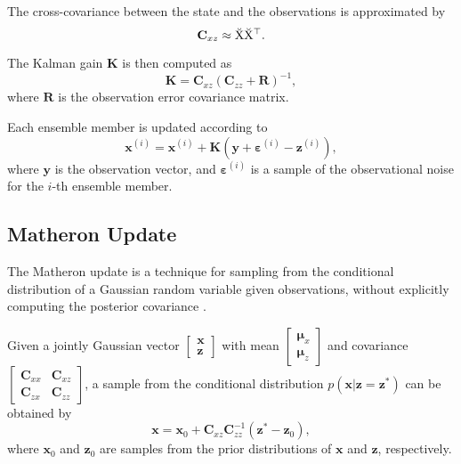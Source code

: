 \documentclass{article}
\theoremstyle{plain}
\begin{document}
The cross-covariance between the state and the observations is approximated by
\begin{equation}
    \mathbf{C}_{xz} \approx \breve{\mathrm{X}} \breve{\mathrm{X}}^\top.
\end{equation}

The Kalman gain $\mathbf{K}$ is then computed as
\begin{equation}
    \mathbf{K} = \mathbf{C}_{xz} \left( \mathbf{C}_{zz} + \mathbf{R} \right)^{-1},
    \label{eq:kalman_gain}
\end{equation}
where $\mathbf{R}$ is the observation error covariance matrix.

Each ensemble member is updated according to
\begin{equation}
    \mathbf{x}^{(i)} = \mathbf{x}^{(i)} + \mathbf{K} \left( \mathbf{y} + \boldsymbol{\varepsilon}^{(i)} - \mathbf{z}^{(i)} \right),
    \label{eq:enkf_update}
\end{equation}
where $\mathbf{y}$ is the observation vector, and $\boldsymbol{\varepsilon}^{(i)}$ is a sample of the observational noise for the $i$-th ensemble member.

\subsection{Matheron Update}

The Matheron update is a technique for sampling from the conditional distribution of a Gaussian random variable given observations, without explicitly computing the posterior covariance \citep{Doucet2010Note,Wilson2020Efficiently,Wilson2021Pathwise}.

Given a jointly Gaussian vector $\begin{bmatrix} \mathbf{x} \\ \mathbf{z} \end{bmatrix}$ with mean $\begin{bmatrix} \boldsymbol{\mu}_x \\ \boldsymbol{\mu}_z \end{bmatrix}$ and covariance $\begin{bmatrix} \mathbf{C}_{xx} & \mathbf{C}_{xz} \\ \mathbf{C}_{zx} & \mathbf{C}_{zz} \end{bmatrix}$, a sample from the conditional distribution $p(\mathbf{x} | \mathbf{z} = \mathbf{z}^*)$ can be obtained by
\begin{equation}
    \mathbf{x} = \mathbf{x}_0 + \mathbf{C}_{xz} \mathbf{C}_{zz}^{-1} \left( \mathbf{z}^* - \mathbf{z}_0 \right),
    \label{eq:matheron_update}
\end{equation}
where $\mathbf{x}_0$ and $\mathbf{z}_0$ are samples from the prior distributions of $\mathbf{x}$ and $\mathbf{z}$, respectively.
\end{document}
